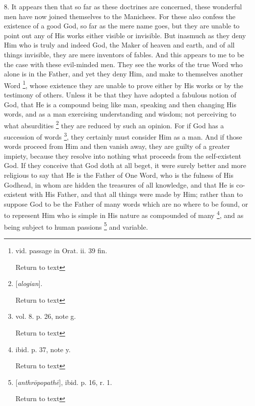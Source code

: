 8. It appears then that so far as these doctrines
are concerned, these wonderful men have now joined themselves to the
Manichees. For these also confess the existence of a good God, so far
as the mere name goes, but they are unable to point out any of His
works either visible or invisible. But inasmuch as they deny Him who
is truly and indeed God, the Maker of heaven and earth, and of all
things invisible, they are mere inventors of fables. And this appears
to me to be the case with these evil-minded men. They see the works of
the true Word who alone is in the Father, and yet they deny Him, and
make to themselves another Word \footnote{vid. passage in Orat. ii. 39 fin.

Return to text},
whose existence they are unable to prove either by His works or by the
testimony of others. Unless it be that they have adopted a fabulous
notion of God, that He is a compound being like man, speaking and then
changing His words, and as a man exercising understanding and wisdom;
not perceiving to what absurdities \footnote{[\emph{alogian}].

Return to text}
they are reduced by such an opinion. For if God has a succession of
words \footnote{vol. 8. p. 26, note g.

Return to text}, they certainly must consider
Him as a man. And if those words proceed from Him and then vanish
away, they are guilty of a greater impiety, because they resolve into
nothing what proceeds from the self-existent God. If they conceive
that God doth at all beget, it were surely better and more religious
to say that He is the Father of One Word, who is the fulness of His
Godhead, in whom are hidden the treasures of all knowledge, and that
He is co-existent with His Father, and that all things were made by
Him; rather than to suppose God to be the Father of many words which
are no where to be found, or to represent Him who is simple in His
nature as compounded of many \footnote{ibid. p. 37, note y.

Return to text}, and as being subject to human
passions \footnote{[\emph{anthr\={o}popath\={e}}], ibid. p. 16, r. 1.

Return to text} and variable.

